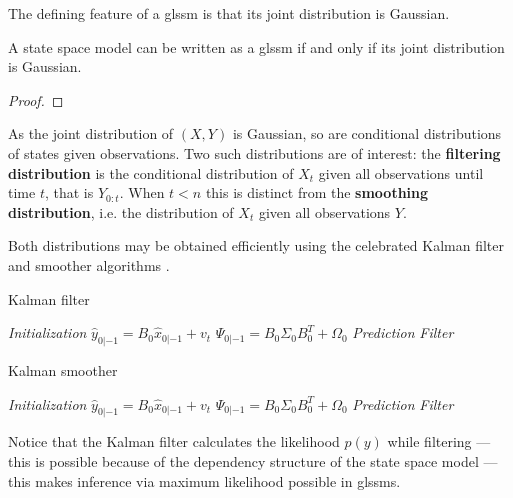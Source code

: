 The defining feature of a \gls{glssm} is that its joint distribution is Gaussian.

\begin{lemma}
    A state space model can be written as a \gls{glssm} if and only if its joint distribution is Gaussian.
\end{lemma}
\begin{proof}
\end{proof}

As the joint distribution of $(X, Y)$ is Gaussian, so are conditional distributions of states given observations. Two such distributions are of interest: the \textbf{filtering distribution} is the conditional distribution of $X_{t}$ given all observations until time $t$, that is $Y_{0:t}$. When $t < n$ this is distinct from the \textbf{smoothing distribution}, i.e. the distribution of $X_{t}$ given all observations $Y$.

Both distributions may be obtained efficiently using the celebrated Kalman filter and smoother algorithms .

\begin{algorithm}
    \caption{Kalman filter}
    \emph{Initialization}\;
    $\hat y_{0|-1} = B_{0}\hat x_{0|-1} + v_{t}$\;
    $\Psi_{0|-1} = B_{0} \Sigma_{0}B_{0}^{T} + \Omega_{0}$\;
    \emph{Prediction}\;
    \emph{Filter}\;
\end{algorithm}

\begin{algorithm}
    \caption{Kalman smoother}
    \emph{Initialization}\;
    $\hat y_{0|-1} = B_{0}\hat x_{0|-1} + v_{t}$\;
    $\Psi_{0|-1} = B_{0} \Sigma_{0}B_{0}^{T} + \Omega_{0}$\;
    \emph{Prediction}\;
    \emph{Filter}\;
\end{algorithm}

Notice that the Kalman filter calculates the likelihood $p(y)$ while filtering --- this is possible because of the dependency structure of the state space model --- this makes inference via maximum likelihood possible in \gls{glssm}s.

